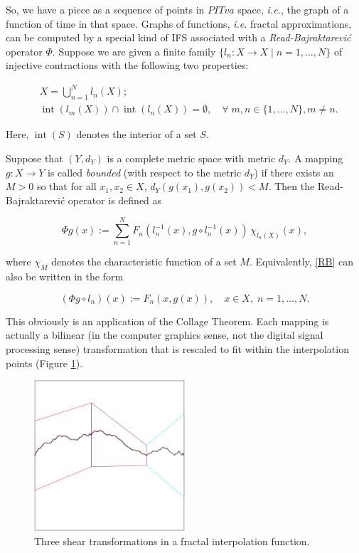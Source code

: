 \documentclass[english,11pt,letterpaper,onecolumn]{scrartcl}
\numberwithin{equation}{section}
\newcommand{\Int}{\mathop{\mathrm{int}}}
\newcommand{\be}{\begin{equation}}
\newcommand{\ee}{\end{equation}}
\begin{document}
So, we have a piece as a sequence of points in $PITva$ space, \textit{i.e.}, 
the graph of a function of time in that space. Graphs of functions, 
\textit{i.e.} fractal approximations, can be computed by a special kind of IFS 
associated with a \textit{Read-Bajraktarevi\'c} operator $\Phi$. Suppose we 
are given a finite family $\{l_n : X\to X \mid n = 1, \ldots, N\}$ of 
injective contractions with the following two properties: 

\begin{align}
&X = \bigcup_{n=1}^N l_n(X);\label{union}\\
&\Int (l_m(X))\cap \Int(l_n(X)) = \emptyset, \quad\forall\;m, n\in \{1,\ldots, 
N\}, m\neq n.\label{partition} 
\end{align}

\noindent Here, $\Int (S)$ denotes the interior of a set $S$.

Suppose that $(Y,d_Y)$ is a complete metric space with metric $d_Y$. A mapping 
$g:X\to Y$ is called \emph{bounded} (with respect to the metric $d_Y$) if 
there exists an $M> 0$ so that for all $x_1, x_2\in X$, $d_Y(g(x_1),g(x_2)) < 
M$. Then the Read-Bajraktarevi\'c operator is defined as

\be\label{RB}
\Phi g (x) := \sum\limits_{n=1}^N F_n (l_n^{-1} (x), g\circ l_n^{-1} 
(x))\,\chi_{l_n(X)}(x), 
\ee

\noindent where $\chi_M$ denotes the characteristic function of a set $M$. 
Equivalently, \eqref{RB} can also be written in the form

\be\label{3.3}
(\Phi g \circ l_n) (x) := F_n (x, g(x)),\quad x\in X, \;n = 1, \ldots, N. 
\ee


This obviously is an application of the Collage Theorem. Each mapping is 
actually a bilinear (in the computer graphics sense, not the digital signal processing sense) transformation that is rescaled 
to fit within the interpolation points (Figure \ref{fig:fif}).

    \begin{figure}
        \centerline{\includegraphics[width = 0.5\textwidth]{interp}}
        \caption{\label{fig:fif} Three shear transformations in 
a fractal interpolation function.\protect\footnotemark}
    \end{figure}
\end{document}
